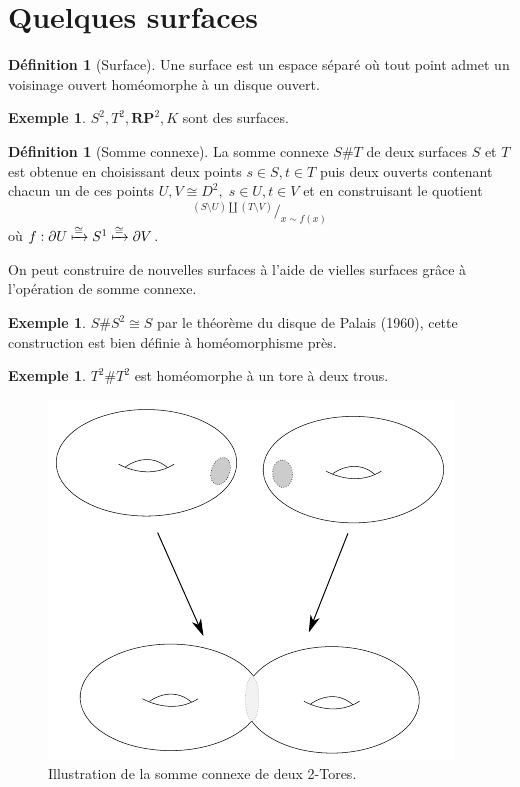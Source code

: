 \documentclass[12pt]{book}
\theoremstyle{definition}
\newtheorem{definition}[lemma]{Définition}
\newtheorem{example}[lemma]{Exemple}
\theoremstyle{remark}
\newcommand*\quot[2]{{^{\textstyle #1}\big/_{\textstyle #2}}}
\begin{document}
	\section{Quelques surfaces}
	\begin{definition}[Surface]
		Une surface est un espace séparé où tout point admet un voisinage ouvert homéomorphe à un disque ouvert.	
	\end{definition}
	\begin{example}
		$S^2, T^2, \mathbf{RP}^2, K$ sont des surfaces. 
	\end{example}
	\begin{definition}[Somme connexe]
		La somme connexe $S\#T$ de deux surfaces $S$ et $T$ est obtenue en choisissant deux points $s \in S, t \in T$ puis deux ouverts contenant chacun un de ces points $U, V \cong D^2, \; s \in U, t \in V$ et en construisant le quotient \[
			\quot{(S\setminus U)\coprod (T \setminus V)}{x\sim f(x)}
		\] 
			où $f : \partial U \xmapsto{\cong} S^1 \xmapsto{\cong} \partial V$.
	\end{definition}
	On peut construire de nouvelles surfaces à l'aide de vielles surfaces grâce à l'opération de somme connexe.
	\begin{example}
		$S\#S^2 \cong S$ par le théorème du disque de Palais (1960), cette construction est bien définie à homéomorphisme près.
	\end{example}
	\begin{example}
		$T^2\#T^2$ est homéomorphe à un tore à deux trous.
	\end{example}
	\begin{figure}[ht]
			\centering
			\includegraphics{connectedsum.pdf}
			\caption{Illustration de la somme connexe de deux 2-Tores.}
	\end{figure}
\end{document}
